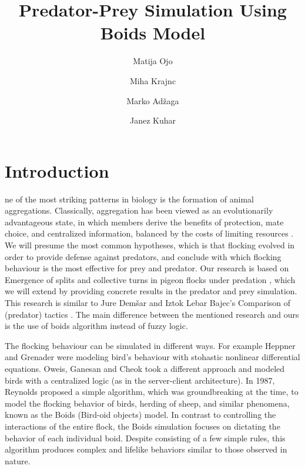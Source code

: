 \documentclass[9pt]{pnas-new}
\title{Predator-Prey Simulation Using Boids Model}
\author{Matija Ojo}
\author{Miha Krajnc}
\author{Marko Adžaga}
\author{Janez Kuhar}
\affil{Collective behaviour course research seminar report}
\begin{document}
\verticaladjustment{-2pt}

\maketitle
\thispagestyle{firststyle}

\section*{Introduction}

ne of the most striking patterns in biology is the formation of animal aggregations.
Classically, aggregation has been viewed as an evolutionarily advantageous state, in which members derive the benefits of protection, mate choice, and centralized information, balanced by the costs of limiting resources \cite{complexity_pattern}.
We will presume the most common hypotheses, which is that flocking evolved in order to provide defense against predators, and conclude with which flocking behaviour is the most effective for prey and predator.
Our research is based on Emergence of splits and collective turns in pigeon flocks under predation \cite{papadopoulou2022emergence}, which we will extend by providing concrete results in the predator and prey simulation.
This research is similar to Jure Demšar and Iztok Lebar Bajec's Comparison of (predator) tactics \cite{JDemsar_predator_attacks}.
The main difference between the mentioned research and ours is the use of boids algorithm instead of fuzzy logic.

The flocking behaviour can be simulated in different ways.
For example Heppner and Grenader \cite{Heppner_nonlinear_model} were modeling bird's behaviour with stohastic nonlinear differential equations.
Oweis, Ganesan and Cheok \cite{centralized_flocking} took a different approach and modeled birds with a centralized logic (as in the server-client architecture).
In 1987, Reynolds \cite{reynolds1987flocks} proposed a simple algorithm, which was groundbreaking at the time, to model the
flocking behavior of birds, herding of sheep, and similar phenomena, known as the Boids (Bird-oid objects) model.
In contrast to controlling the interactions of the entire flock, the Boids simulation focuses on
dictating the behavior of each individual boid. Despite consisting of a few simple rules, this
algorithm produces complex and lifelike behaviors similar to those observed in nature.
\end{document}
